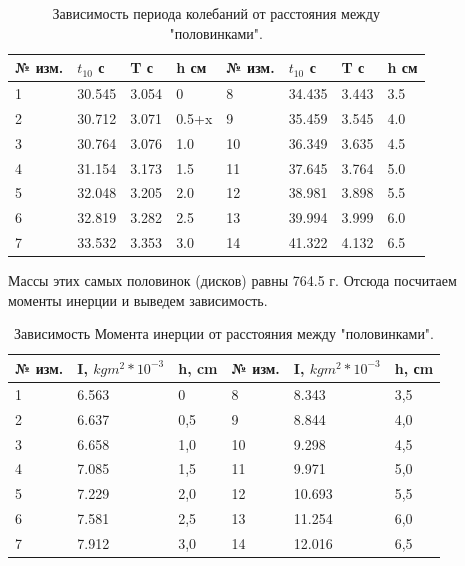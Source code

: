 \documentclass[12pt,a4paper]{article}
\begin{document}
\begin{table}[b]
			\begin{center}
				\begin{tabular}{| l | l || l | l || l | l || l | l ||}
					\hline
					№ изм. & $t_{10}$  с & T  с & h  см & № изм. & $t_{10}$  с & T  с & h  см\\ \hline
					1 & 30.545 & 3.054 & 0 & 8 & 34.435 & 3.443 & 3.5 \\ \hline
					2 & 30.712 & 3.071 & 0.5+x & 9 & 35.459 & 3.545 & 4.0 \\ \hline
					3 & 30.764 & 3.076 & 1.0 & 10 & 36.349 &3.635 & 4.5 \\ \hline
					4 & 31.154 & 3.173 & 1.5 & 11 & 37.645 & 3.764 & 5.0 \\ \hline
					5 & 32.048 & 3.205 & 2.0 & 12 & 38.981 & 3.898 & 5.5 \\ \hline
					6 &  32.819& 3.282 & 2.5 & 13 & 39.994 & 3.999 & 6.0 \\ \hline
					7 & 33.532 & 3.353 & 3.0 & 14 & 41.322 & 4.132 & 6.5 \\ \hline
				\end{tabular}
				\caption{Зависимость периода колебаний от расстояния между "половинками".}
				\label{tab:period}
			\end{center}
		\end{table}
Массы этих самых половинок (дисков) равны 764.5 г. Отсюда посчитаем моменты инерции и выведем зависимость.
\begin{table}[t]
			\begin{center}
				\begin{tabular}{| l | l | l || l | l | l |}
					\hline
					№ изм. & I, $kgm^2 * 10^{-3}$ & h, cm & № изм. & I, $kgm^2 * 10^{-3}$ & h, сm \\ \hline
					1 & 6.563 & 0 & 8 & 8.343 & 3,5 \\ \hline
					2 & 6.637 & 0,5 & 9 & 8.844 & 4,0 \\ \hline
					3 & 6.658 & 1,0 & 10 & 9.298 & 4,5 \\ \hline
					4 & 7.085 & 1,5 & 11 & 9.971 & 5,0 \\ \hline
					5 & 7.229 & 2,0 & 12 & 10.693 & 5,5 \\ \hline
					6 & 7.581 & 2,5 & 13 & 11.254 & 6,0 \\ \hline
					7 & 7.912 & 3,0 & 14 & 12.016 & 6,5 \\ \hline
				\end{tabular}
				\caption{Зависимость Момента инерции от расстояния между "половинками".}
				\label{tab:moment}
			\end{center}
		\end{table}
\end{document}
